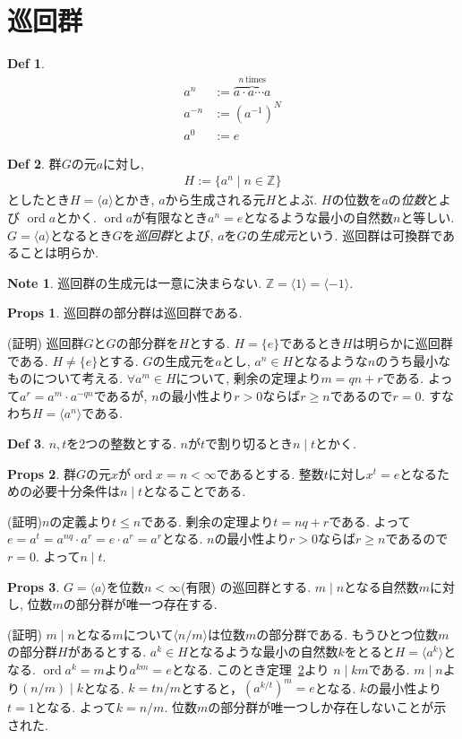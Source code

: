 \documentclass[dvipdfmx]{jsarticle}
\theoremstyle{definition}
\newtheorem{props}{Props}
\newtheorem{definition}{Def}
\newtheorem{note}{Note}
\numberwithin{equation}{section}
\numberwithin{props}{section}
\numberwithin{definition}{section}
\numberwithin{note}{section}
\DeclareMathOperator{\ord}{ord}
\begin{document}
\section{巡回群}
\begin{definition}
     \begin{align}
      a^n&:=\overbrace{a\cdot a\cdots a}^{n\,\mathrm{times}}\\
      a^{-n}&:=(a^{-1})^N\\
      a^0&:=e
     \end{align}
\end{definition}
\begin{definition}
     群$G$の元$a$に対し,
     \begin{align}
          H:=\lbrace a^n\mid n\in \mathbb{Z}\rbrace
     \end{align}
     としたとき$H=\langle a\rangle$とかき, $a$から生成される元$H$とよぶ. $H$の位数を$a$の\emph{位数}とよび $\ord a$とかく. $\ord a$が有限なとき$a^n=e$となるような最小の自然数$n$と等しい. $G=\langle a\rangle$となるとき$G$を\emph{巡回群}とよび, $a$を$G$の\emph{生成元}という. 巡回群は可換群であることは明らか.
\end{definition}
\begin{note}
     巡回群の生成元は一意に決まらない. $\mathbb{Z}=\langle 1\rangle=\langle-1\rangle$.
\end{note}
\begin{props}
     巡回群の部分群は巡回群である.
\end{props}
(証明) 巡回群$G$と$G$の部分群を$H$とする. $H=\lbrace e\rbrace$であるとき$H$は明らかに巡回群である.
$H\neq \lbrace e\rbrace$とする. $G$の生成元を$a$とし, $a^n\in H$となるような$n$のうち最小なものについて考える. $\forall a^m \in H$について, 剰余の定理より$m=qn+r$である. 
よって$a^r= a^m\cdot a^{-qn}$であるが, $n$の最小性より$r>0$ならば$r\geq n$であるので$r=0$.
すなわち$H=\langle a^n\rangle$である.
\begin{definition}
     $n,t$を2つの整数とする. $n$が$t$で割り切るとき$n\mid t$とかく.
\end{definition}
\begin{props}\label{them::n|t}
     群$G$の元$x$が$\ord  x=n <\infty$であるとする. 整数$t$に対し$x^t=e$となるための必要十分条件は$n\mid t$となることである.
\end{props}
(証明)$n$の定義より$t\leq n$である. 剰余の定理より$t=nq+r$である. よって$e=a^t=a^{nq}\cdot a^r=e\cdot a^r=a^r$となる. $n$の最小性より$r> 0$ならば$r\geq n$であるので$r=0$. よって$n\mid t$.
\begin{props}
    $G=\langle a\rangle$を位数$n<\infty$(有限) の巡回群とする. $m\mid n$となる自然数$m$に対し, 位数$m$の部分群が唯一つ存在する. 
\end{props}
(証明) $m\mid n$となる$m$について$\langle n/m\rangle$は位数$m$の部分群である. もうひとつ位数$m$の部分群$H$があるとする. $a^k\in H$となるような最小の自然数$k$をとると$H=\langle a^k \rangle$となる. $\ord  a^k=m$より$a^{km}=e$となる. このとき定理~\ref{them::n|t}より $n\mid km$である. $m\mid n$より$(n/m)\mid k$となる. $k= tn/m$とすると，$(a^{k/t})^m=e$となる. $k$の最小性より$t=1$となる. よって$k=n/m$. 位数$m$の部分群が唯一つしか存在しないことが示された.
\end{document}
